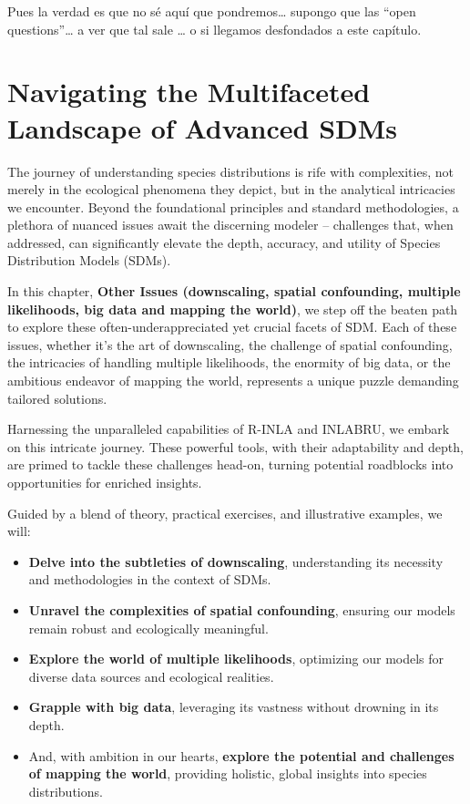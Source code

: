 \documentclass[
]{krantz}
\providecommand{\tightlist}{%
  \setlength{\itemsep}{0pt}\setlength{\parskip}{0pt}}
\begin{document}
Pues la verdad es que no sé aquí que pondremos\ldots{} supongo que las ``open questions''\ldots{} a ver que tal sale \ldots{} o si llegamos desfondados a este capítulo.

\hypertarget{navigating-the-multifaceted-landscape-of-advanced-sdms}{%
\section{Navigating the Multifaceted Landscape of Advanced SDMs}\label{navigating-the-multifaceted-landscape-of-advanced-sdms}}

The journey of understanding species distributions is rife with complexities, not merely in the ecological phenomena they depict, but in the analytical intricacies we encounter. Beyond the foundational principles and standard methodologies, a plethora of nuanced issues await the discerning modeler -- challenges that, when addressed, can significantly elevate the depth, accuracy, and utility of Species Distribution Models (SDMs).

In this chapter, \textbf{Other Issues (downscaling, spatial confounding, multiple likelihoods, big data and mapping the world)}, we step off the beaten path to explore these often-underappreciated yet crucial facets of SDM. Each of these issues, whether it's the art of downscaling, the challenge of spatial confounding, the intricacies of handling multiple likelihoods, the enormity of big data, or the ambitious endeavor of mapping the world, represents a unique puzzle demanding tailored solutions.

Harnessing the unparalleled capabilities of R-INLA and INLABRU, we embark on this intricate journey. These powerful tools, with their adaptability and depth, are primed to tackle these challenges head-on, turning potential roadblocks into opportunities for enriched insights.

Guided by a blend of theory, practical exercises, and illustrative examples, we will:

\begin{itemize}
\tightlist
\item
  \textbf{Delve into the subtleties of downscaling}, understanding its necessity and methodologies in the context of SDMs.
\item
  \textbf{Unravel the complexities of spatial confounding}, ensuring our models remain robust and ecologically meaningful.
\item
  \textbf{Explore the world of multiple likelihoods}, optimizing our models for diverse data sources and ecological realities.
\item
  \textbf{Grapple with big data}, leveraging its vastness without drowning in its depth.
\item
  And, with ambition in our hearts, \textbf{explore the potential and challenges of mapping the world}, providing holistic, global insights into species distributions.
\end{itemize}
\end{document}
